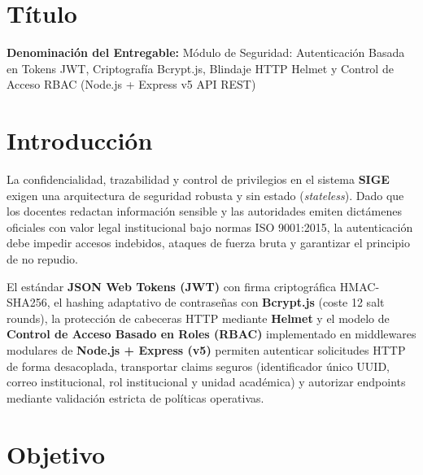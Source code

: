 \documentclass[12pt,a4paper]{article}
\begin{document}

\vspace{0.25cm}
\section{Título}
\textbf{Denominación del Entregable:} Módulo de Seguridad: Autenticación Basada en Tokens JWT, Criptografía Bcrypt.js, Blindaje HTTP Helmet y Control de Acceso RBAC (Node.js + Express v5 API REST)



\section{Introducción}
La confidencialidad, trazabilidad y control de privilegios en el sistema \textbf{SIGE} exigen una arquitectura de seguridad robusta y sin estado (\textit{stateless}). Dado que los docentes redactan información sensible y las autoridades emiten dictámenes oficiales con valor legal institucional bajo normas ISO 9001:2015, la autenticación debe impedir accesos indebidos, ataques de fuerza bruta y garantizar el principio de no repudio.

El estándar \textbf{JSON Web Tokens (JWT)} con firma criptográfica HMAC-SHA256, el hashing adaptativo de contraseñas con \textbf{Bcrypt.js} (coste 12 salt rounds), la protección de cabeceras HTTP mediante \textbf{Helmet} y el modelo de \textbf{Control de Acceso Basado en Roles (RBAC)} implementado en middlewares modulares de \textbf{Node.js + Express (v5)} permiten autenticar solicitudes HTTP de forma desacoplada, transportar claims seguros (identificador único UUID, correo institucional, rol institucional y unidad académica) y autorizar endpoints mediante validación estricta de políticas operativas.

\section{Objetivo}
\end{document}
